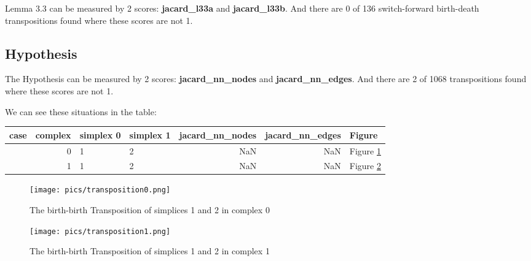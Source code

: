 \documentclass{article}
\begin{document}
\par Lemma 3.3 can be measured by 2 scores: \textbf{jacard\_l33a} and \textbf{jacard\_l33b}.
And there are 0 of 136 switch-forward birth-death transpositions found where these scores are not 1.

\subsection{Hypothesis}

\par The Hypothesis can be measured by 2 scores: \textbf{jacard\_nn\_nodes} and \textbf{jacard\_nn\_edges}.
And there are 2 of 1068 transpositions found where these scores are not 1.
\par We can see these situations in the table:
\begin{center}\begin{tabular}{lrllrrl}
\toprule
case & complex & simplex 0 & simplex 1 & jacard\_nn\_nodes & jacard\_nn\_edges & Figure \\
\midrule
& 0 & 1 & 2 & NaN & NaN & Figure \ref{fig:unexpected0} \\
& 1 & 1 & 2 & NaN & NaN & Figure \ref{fig:unexpected1} \\
\bottomrule
\end{tabular}
\end{center}


\begin{figure}[ht]
\centering
\texttt{[image: pics/transposition0.png]}
\caption{The birth-birth Transposition of simplices 1 and 2 in complex 0}
\label{fig:unexpected0}
\end{figure}

\begin{figure}[ht]
\centering
\texttt{[image: pics/transposition1.png]}
\caption{The birth-birth Transposition of simplices 1 and 2 in complex 1}
\label{fig:unexpected1}
\end{figure}
\end{document}
